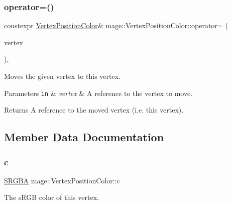 \subsubsection{\texorpdfstring{operator=()}{operator=()}\hspace{0.1cm}{\footnotesize\ttfamily [2/2]}}
{\footnotesize\ttfamily constexpr \hyperlink{structmage_1_1_vertex_position_color}{Vertex\+Position\+Color}\& mage\+::\+Vertex\+Position\+Color\+::operator= (\begin{DoxyParamCaption}\item[{\hyperlink{structmage_1_1_vertex_position_color}{Vertex\+Position\+Color} \&\&}]{vertex }\end{DoxyParamCaption})\hspace{0.3cm}{\ttfamily [default]}, {\ttfamily [noexcept]}}

Moves the given vertex to this vertex.


\begin{DoxyParams}[1]{Parameters}
\mbox{\tt in}  & {\em vertex} & A reference to the vertex to move. \\
\hline
\end{DoxyParams}
\begin{DoxyReturn}{Returns}
A reference to the moved vertex (i.\+e. this vertex). 
\end{DoxyReturn}


\subsection{Member Data Documentation}
\hypertarget{structmage_1_1_vertex_position_color_a18b969637a84ba42f99fd2c54cfc779a}{}\label{structmage_1_1_vertex_position_color_a18b969637a84ba42f99fd2c54cfc779a} 
\subsubsection{\texorpdfstring{c}{c}}
{\footnotesize\ttfamily \hyperlink{structmage_1_1_s_r_g_b_a}{S\+R\+G\+BA} mage\+::\+Vertex\+Position\+Color\+::c}

The s\+R\+GB color of this vertex. \hypertarget{structmage_1_1_vertex_position_color_afe40a78afb8e13e742d93d5092b1a614}{}\label{structmage_1_1_vertex_position_color_afe40a78afb8e13e742d93d5092b1a614} 
